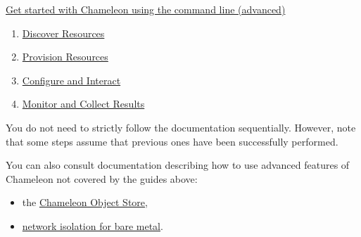 \href{https://www.chameleoncloud.org/discover-resources-command-lines}{Get
started with Chameleon using the command line (advanced)}

\begin{enumerate}
\item
  \href{https://www.chameleoncloud.org/discover-resources-command-lines/}{Discover
  Resources}
\item
  \href{https://www.chameleoncloud.org/advanced-provision-resources/}{Provision
  Resources}
\item
  \href{https://www.chameleoncloud.org/advanced-configure-and-interact/}{Configure
  and Interact}
\item
  \href{https://www.chameleoncloud.org/monitor-and-collect/}{Monitor and
  Collect Results}
\end{enumerate}

You do not need to strictly follow the documentation sequentially.
However, note that some steps assume that previous ones have been
successfully performed.

You can also consult documentation describing how to use advanced
features of Chameleon not covered by the guides above:

\begin{itemize}
\item
  the
  \href{https://www.chameleoncloud.org/docs/bare-metal-user-guide/chameleon-object-store/}{Chameleon
  Object Store},
\item
  \href{https://www.chameleoncloud.org/docs/bare-metal-user-guide/network-isolation-bare-metal/}{network
  isolation for bare metal}.
\end{itemize}


